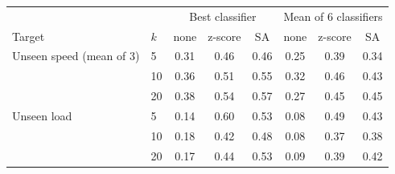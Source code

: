\begin{tabular}{llcccccc}
\toprule
 & & \multicolumn{3}{c}{Best classifier} & \multicolumn{3}{c}{Mean of 6 classifiers} \\
Target & $k$ & none & z-score & SA & none & z-score & SA \\
\midrule
Unseen speed (mean of 3) & 5 & 0.31 & 0.46 & 0.46 & 0.25 & 0.39 & 0.34 \\
 & 10 & 0.36 & 0.51 & 0.55 & 0.32 & 0.46 & 0.43 \\
 & 20 & 0.38 & 0.54 & 0.57 & 0.27 & 0.45 & 0.45 \\
Unseen load & 5 & 0.14 & 0.60 & 0.53 & 0.08 & 0.49 & 0.43 \\
 & 10 & 0.18 & 0.42 & 0.48 & 0.08 & 0.37 & 0.38 \\
 & 20 & 0.17 & 0.44 & 0.53 & 0.09 & 0.39 & 0.42 \\
\bottomrule
\end{tabular}
